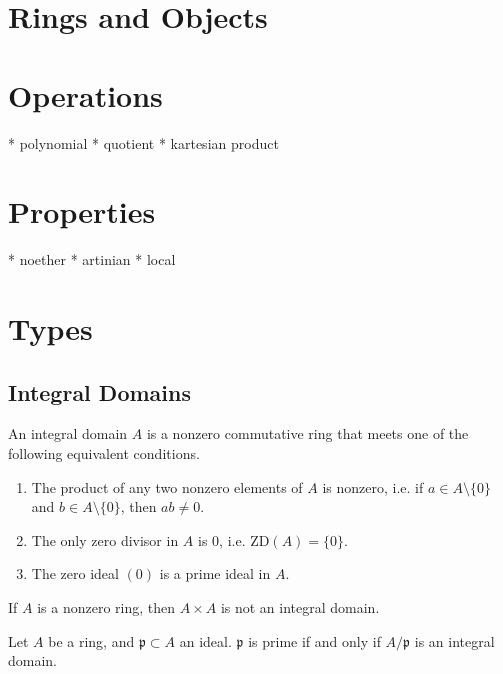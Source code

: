 \section{Rings and Objects}
\section{Operations}
* polynomial
* quotient
* kartesian product
\section{Properties}
* noether
* artinian
* local
\section{Types}
\subsection{Integral Domains}
\begin{defbox}
    \begin{definition}
        An integral domain \(A\) is a nonzero commutative ring that meets one of the following equivalent conditions.
        \begin{enumerate}
            \item The product of any two nonzero elements of \(A\) is nonzero, i.e. if \(a \in A \setminus \{0\}\) and \(b \in A \setminus \{0\}\), then \(ab \neq 0\).
            \item The only zero divisor in \(A\) is \(0\), i.e. \(\mathrm{ZD}(A) = \{0\}\).
            \item The zero ideal \((0)\) is a prime ideal in \(A\).
        \end{enumerate}
    \end{definition}
\end{defbox}

\begin{thmbox}
    \begin{proposition}
        If \(A\) is a nonzero ring, then \(A \times A\) is not an integral domain.
    \end{proposition}
\end{thmbox}

\begin{thmbox}
    \begin{proposition}
        Let \(A\) be a ring, and \(\mathfrak{p} \subset A\) an ideal. \(\mathfrak{p}\) is prime if and only if \(A / \mathfrak{p}\) is an integral domain.
    \end{proposition}
\end{thmbox}

